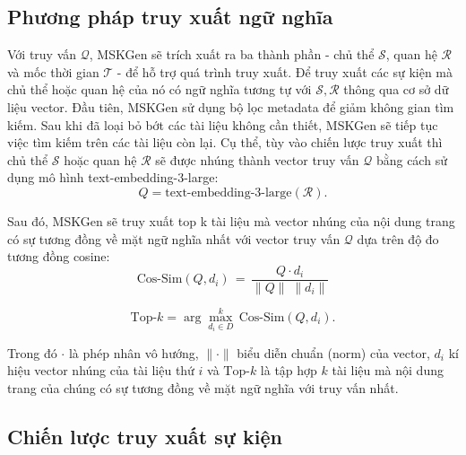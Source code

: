 \vspace{1em}
\subsection{Phương pháp truy xuất ngữ nghĩa}

Với truy vấn $\mathcal{Q}$, MSKGen sẽ trích xuất ra ba thành phần - chủ thể $\mathcal{S}$, quan hệ $\mathcal{R}$ và mốc thời gian $\mathcal{T}$ - để hỗ trợ quá trình truy xuất. Để truy xuất các sự kiện mà chủ thể hoặc quan hệ của nó có ngữ nghĩa tương tự với $\mathcal{S, R}$ thông qua cơ sở dữ liệu vector. Đầu tiên, MSKGen sử dụng bộ lọc metadata để giảm không gian tìm kiếm. Sau khi đã loại bỏ bớt các tài liệu không cần thiết, MSKGen sẽ tiếp tục việc tìm kiếm trên các tài liệu còn lại. Cụ thể, tùy vào chiến lược truy xuất thì chủ thể $\mathcal{S}$ hoặc quan hệ $\mathcal{R}$ sẽ được nhúng thành vector truy vấn $\mathcal{Q}$ bằng cách sử dụng mô hình text-embedding-3-large:
\begin{equation}  
\label{eq:query-embed}  
Q = \text{text-embedding-3-large}(\mathcal{R}).
\tag{?}  
\end{equation}

Sau đó, MSKGen sẽ truy xuất top k tài liệu mà vector nhúng của nội dung trang có sự tương đồng về mặt ngữ nghĩa nhất với vector truy vấn $\mathcal{Q}$ dựa trên độ đo tương đồng cosine:
\begin{equation}  
\label{eq:cos-sim}  
\text{Cos-Sim}(Q, d_{i})   
\,=\, \frac{Q \cdot d_{i}}{\|Q\|\;\|d_{i}\|}  
\tag{x}  %
\end{equation}

\begin{equation}  
\label{eq:top-sim}  
\text{Top-}k   
= \arg\max_{d_i \in D}^{k}\,\text{Cos-Sim}(Q, d_i).  
\tag{x}  
\end{equation} 

Trong đó $\cdot$ là phép nhân vô hướng, $\|\cdot\|$ biểu diễn chuẩn (norm) của vector, $d_{i}$ kí hiệu vector nhúng của tài liệu thứ $i$ và $\text{Top-}k$ là tập hợp $k$ tài liệu mà nội dung trang của chúng có sự tương đồng về mặt ngữ nghĩa với truy vấn nhất.

\vspace{1em}
\subsection{Chiến lược truy xuất sự kiện}

